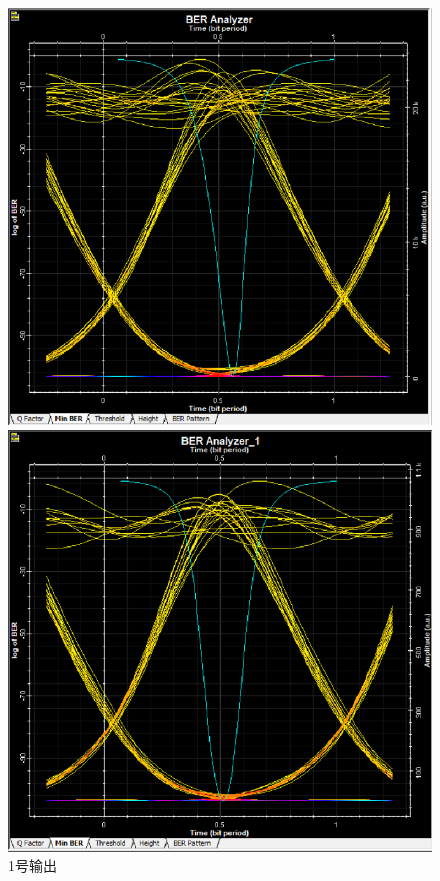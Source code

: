 \documentclass[12pt, a4paper, oneside]{article}
\begin{document}
\begin{spacing}{2.0}
\begin{figure}[H]
    \begin{minipage}[t]{0.5\linewidth}
        \centering
        \includegraphics[scale=0.5]{sweep2BER1.png}
        \caption{1号输出}
        \label{fig:side:a}
      \end{minipage}%
      \begin{minipage}[t]{0.5\linewidth}
        \centering
        \includegraphics[scale=0.5]{sweep2BER2.png}

\end{minipage}
\end{figure}
\end{spacing}
\end{document}
